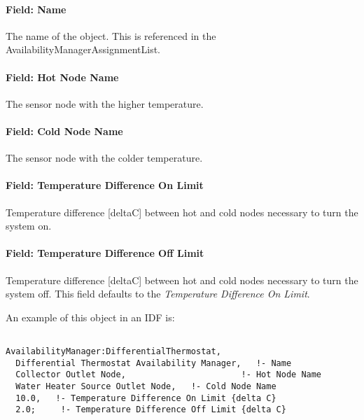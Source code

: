 \paragraph{Field: Name}\label{field-name-3-032}

The name of the object. This is referenced in the AvailabilityManagerAssignmentList.

\paragraph{Field: Hot Node Name}\label{field-hot-node-name}

The sensor node with the higher temperature.

\paragraph{Field: Cold Node Name}\label{field-cold-node-name}

The sensor node with the colder temperature.

\paragraph{Field: Temperature Difference On Limit}\label{field-temperature-difference-on-limit}

Temperature difference {[}deltaC{]} between hot and cold nodes necessary to turn the system on.

\paragraph{Field: Temperature Difference Off Limit}\label{field-temperature-difference-off-limit}

Temperature difference {[}deltaC{]} between hot and cold nodes necessary to turn the system off. This field defaults to the \emph{Temperature Difference On Limit}.

An example of this object in an IDF is:

\begin{lstlisting}

AvailabilityManager:DifferentialThermostat,
  Differential Thermostat Availability Manager,   !- Name
  Collector Outlet Node,                       !- Hot Node Name
  Water Heater Source Outlet Node,   !- Cold Node Name
  10.0,   !- Temperature Difference On Limit {delta C}
  2.0;     !- Temperature Difference Off Limit {delta C}
\end{lstlisting}

